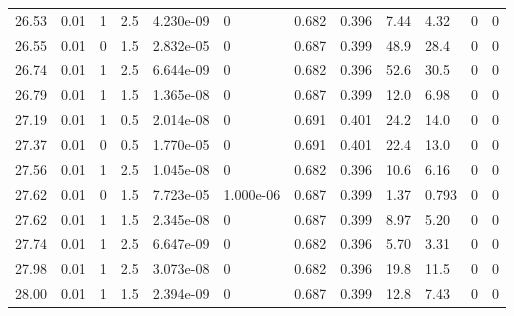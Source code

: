 \documentclass[preview]{standalone}
\begin{document}
{{{{\begin{tabular}{L{1.2cm}C{1.2cm} C{0.3cm}C{0.5cm} C{1.4cm}C{1.4cm} C{1.4cm}C{1.4cm} C{1.6cm}C{1.6cm} C{1.6cm}C{1.6cm}}
  26.53  &  0.01  & 1     & 2.5 &  4.230e-09  & 0  &  0.682&   0.396& 7.44 & 4.32   &  0 & 0  \\ 
  26.55  &  0.01  & 0     & 1.5 &  2.832e-05  & 0  &  0.687&   0.399& 48.9 & 28.4   &  0 & 0  \\ 
  26.74  &  0.01  & 1     & 2.5 &  6.644e-09  & 0  &  0.682&   0.396& 52.6 & 30.5   &  0 & 0  \\ 
  26.79  &  0.01  & 1     & 1.5 &  1.365e-08  & 0  &  0.687&   0.399& 12.0 & 6.98   &  0 & 0  \\ 
  27.19  &  0.01  & 1     & 0.5 &  2.014e-08  & 0  &  0.691&   0.401& 24.2 & 14.0   &  0 & 0  \\ 
  27.37  &  0.01  & 0     & 0.5 &  1.770e-05  & 0  &  0.691&   0.401& 22.4 & 13.0   &  0 & 0  \\ 
  27.56  &  0.01  & 1     & 2.5 &  1.045e-08  & 0  &  0.682&   0.396& 10.6 & 6.16   &  0 & 0  \\ 
  27.62  &  0.01  & 0     & 1.5 &  7.723e-05  & 1.000e-06  &  0.687&   0.399& 1.37 & 0.793   &  0 & 0  \\ 
  27.62  &  0.01  & 1     & 1.5 &  2.345e-08  & 0  &  0.687&   0.399& 8.97 & 5.20   &  0 & 0  \\ 
  27.74  &  0.01  & 1     & 2.5 &  6.647e-09  & 0  &  0.682&   0.396& 5.70 & 3.31   &  0 & 0  \\ 
  27.98  &  0.01  & 1     & 2.5 &  3.073e-08  & 0  &  0.682&   0.396& 19.8 & 11.5   &  0 & 0  \\ 
  28.00  &  0.01  & 1     & 1.5 &  2.394e-09  & 0  &  0.687&   0.399& 12.8 & 7.43   &  0 & 0  \\ 
\hline 
\end{tabular} 

}}}}
\end{document}
